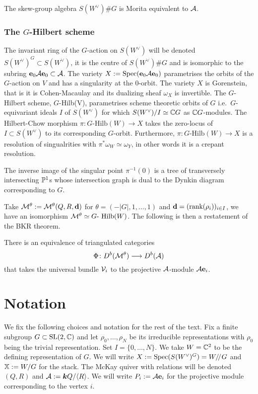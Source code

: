 \documentclass{amsart}
\theoremstyle{definition}
\begin{document}
\begin{theorem}
The skew-group algebra $S(W^\vee) \# G$ is Morita equivalent to $\mathcal{A}$.
\end{theorem}

\subsubsection{The $G$-Hilbert scheme}

The invariant ring of the $G$-action on $S(W^\vee)$ will be denoted $S(W^\vee)^G \subset S(W^\vee)$, it is the centre of $S(W^\vee) \# G$ and is isomorphic to the subring $\mathbf{e}_0 \mathcal{A} \mathbf{e}_0 \subset \mathcal{A}$.
The variety $X:= \operatorname{Spec}(\mathbf{e}_0 \mathcal{A} \mathbf{e}_0)$ parametrises the orbits of the $G$-action on $V$ and has a singularity at the $0$-orbit.
The variety $X$ is Gorenstein, that is it is Cohen-Macaulay and its dualizing sheaf $\omega_X$ is invertible.
The $G$-Hilbert scheme, $G$-Hilb(V), parametrises scheme theoretic orbits of $G$ i.e.\ $G$-equivariant ideals $I$ of $S(W^\vee)$ for which $S(W^\vee)/I \simeq \mathbb{C} G$ as $\mathbb{C} G$-modules.
The Hilbert-Chow morphism $\pi \colon G\text{-Hilb}(W) \rightarrow X$ takes the zero-locus of $I \subset S(W^\vee)$ to its corresponding $G$-orbit.
Furthermore, $\pi \colon G\text{-Hilb}(W) \rightarrow X$ is a resolution of singualrities with $\pi^*\omega_W \simeq \omega_Y$, in other words it is a crepant resolution.

\begin{theorem}
The inverse image of the singular point $\pi^{-1}(0)$ is a tree of transversely intersecting $\mathbb{P}^1$s whose intersection graph is dual to the Dynkin diagram corresponding to $G$.
\end{theorem}

Take $\mathcal{M}^\theta:=\mathcal{M}^\theta(Q,R,\mathbf{d})$ for $\theta = (-|G|,1, \ldots, 1)$ and $\mathbf{d}=(\text{rank}(\rho_i))_{i \in I}$, we have an isomorphism $\mathcal{M}^\theta \simeq G\text{- Hilb}(W)$.
The following is then a restatement of the BKR theorem.

\begin{theorem}
There is an equivalence of triangulated categories $$\Phi \colon D^b(\mathcal{M}^\theta) \longrightarrow D^b(\mathcal{A})$$ that takes the universal bundle $\mathcal{V}_i$ to the projective $\mathcal{A}$-module $\mathcal{A}\mathbf{e}_i$.
\end{theorem}

\section*{Notation}
We fix the following choices and notation for the rest of the text.
Fix a finite subgroup $G \subset \operatorname{SL}(2,\mathbb{C})$ and let $\rho_0, \ldots, \rho_N$ be its
irreducible representations with $\rho_0$ being the trivial representation.
Set $I=\{0,\ldots,N\}$.
We take $W=\mathbb{C}^2$ to be the defining representation of $G$.
We will write $X:=\operatorname{Spec}(S(W^\vee)^G) = W / \! /_{} G$ and $\mathbb{X}:=W/G$ for the stack.
The McKay quiver with relations will be denoted $(Q,R)$ and $\mathcal{A}:= {\boldsymbol{k}} Q/ \langle R\rangle$.
We will write $P_i:= \mathcal{A}\mathbf{e}_i$ for the projective module corresponding to the vertex $i$.
\end{document}
